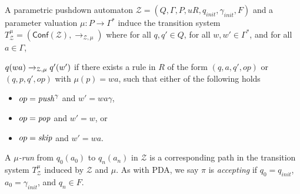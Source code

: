 \documentclass[a4paper,UKenglish,cleveref, autoref, thm-restate]{lipics-v2021}
\newcommand{\Conf}{\mathsf{Conf}}
\begin{document}
\begin{samepage}
A parametric pushdown automaton  $\mathcal{Z}= (Q, \Gamma, P,u R, q_{init}, \gamma_{init},F)$ 
and a parameter valuation $\mu: P\rightarrow \Gamma^*$ induce the 
transition system  
$T_{\mathcal{Z}}^{\mu} = (\Conf(\mathcal{Z}), 
\rightarrow_{\mathcal{Z},\mu})$ where
for all $ q, q'  \in  Q$, 
for all $ w,w' \in \Gamma^* $, and 
for all $ a  \in  \Gamma$, 

$q(wa) \xrightarrow{%
}_{\mathcal{Z},\mu} q'(w')$
if there exists a rule in $R$
 of the form $(q,a,q', op)$ or $(q,p,q', op)$ with $\mu(p)=wa$,
such that
either of the following holds
\begin{itemize}
\item $ op = \text{\textit{push}}^\gamma$ and $w' = wa\gamma$,

\item $ op = \text{\textit{pop}}$ and $w' = w$, or

\item $ op = \text{\textit{skip}}$ and $w' = wa$.
\end{itemize}
\end{samepage}


A {\em $\mu$-run} from $q_0(a_0)$ to $q_n(a_n)$ in $\mathcal{Z}$ is a corresponding
path in the transition system 
$T_{\mathcal{Z}}^\mu$ 
induced by $\mathcal{Z}$ and $\mu$.
%
%
As with PDA, we say $\pi$ is {\em accepting} if $q_0 = q_{init}$, $a_0=\gamma_{init}$,
and $q_n\in F$.
%
\end{document}
